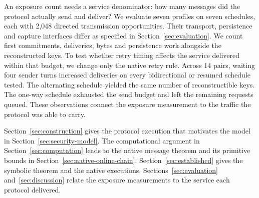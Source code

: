 An exposure count needs a service denominator: how many messages did the
protocol actually send and deliver? We evaluate seven profiles on seven
schedules, each with 2,048 directed transmission opportunities. Their
transport, persistence and capture interfaces differ as specified in
Section~\ref{sec:evaluation}. We count first commitments, deliveries, bytes and
persistence work alongside the reconstructed keys. To test whether retry
timing affects the service delivered within that budget, we change only
the native retry rule. Across 14 pairs, waiting four sender turns
increased deliveries on every bidirectional or resumed schedule tested.
The alternating schedule yielded the same number of reconstructible
keys. The one-way schedule exhausted the send budget and left the
remaining requests queued. These observations connect the exposure
measurement to the traffic the protocol was able to carry.

Section~\ref{sec:construction} gives the protocol execution that
motivates the model in Section~\ref{sec:security-model}. The computational
argument in Section~\ref{sec:computation} leads to the native message
theorem and its primitive bounds in Section~\ref{sec:native-online-chain}.
Section~\ref{sec:established} gives the symbolic theorem and the native
executions. Sections~\ref{sec:evaluation} and~\ref{sec:discussion}
relate the exposure measurements to the service each protocol delivered.
